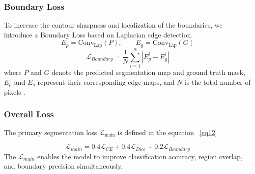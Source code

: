\documentclass[pdflatex,sn-mathphys-num]{sn-jnl}
\begin{document}
\subsubsection{Boundary Loss}
To increase the contour sharpness and localization of the boundaries, we introduce a Boundary Loss based on Laplacian edge detection. 
\begin{equation}
E_{p} = \text{Conv}_{\text{Lap}}(P), \qquad
E_{g} = \text{Conv}_{\text{Lap}}(G)
\end{equation}
\begin{equation}
\mathcal{L}_{Boundary} = \frac{1}{N} \sum_{i=1}^{N} \left| E_{p}^{i} - E_{g}^{i} \right|
\end{equation}
where $P$ and $G$ denote the predicted segmentation map and ground truth mask, $E_p$ and $E_g$ represent their corresponding edge maps, and $N$ is the total number of pixels \cite{kervadec2019boundary}.
\subsubsection{Overall Loss}

The primary segmentation loss $\mathcal{L}_{\text{main}}$ is defined in the equation ~\ref{eq12}

\begin{equation}
\mathcal{L}_{main} =
0.4\mathcal{L}_{CE}
+
0.4\mathcal{L}_{Dice}
+
0.2\mathcal{L}_{Boundary}\label{eq12}
\end{equation}
The $\mathcal{L}_{main}$ enables the model to improve classification accuracy, region overlap, and boundary precision simultaneously.
\end{document}
